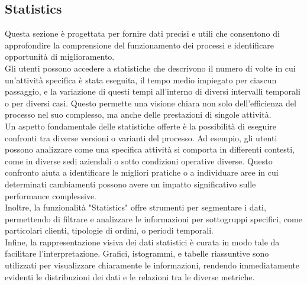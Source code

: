 \documentclass{article}
\begin{document}
\subsection{Statistics}
Questa sezione è progettata per fornire dati precisi e utili che consentono di approfondire la comprensione del funzionamento dei processi e identificare opportunità di miglioramento.\\
Gli utenti possono accedere a statistiche che descrivono il numero di volte in cui un'attività specifica è stata eseguita, il tempo medio impiegato per ciascun passaggio, e la variazione di questi tempi all'interno di diversi intervalli temporali o per diversi casi. Questo permette una visione chiara non solo dell'efficienza del processo nel suo complesso, ma anche delle prestazioni di singole attività.\\
Un aspetto fondamentale delle statistiche offerte è la possibilità di eseguire confronti tra diverse versioni o varianti del processo. Ad esempio, gli utenti possono analizzare come una specifica attività si comporta in differenti contesti, come in diverse sedi aziendali o sotto condizioni operative diverse. Questo confronto aiuta a identificare le migliori pratiche o a individuare aree in cui determinati cambiamenti possono avere un impatto significativo sulle performance complessive.\\
Inoltre, la funzionalità "Statistics" offre strumenti per segmentare i dati, permettendo di filtrare e analizzare le informazioni per sottogruppi specifici, come particolari clienti, tipologie di ordini, o periodi temporali.\\
Infine, la rappresentazione visiva dei dati statistici è curata in modo tale da facilitare l'interpretazione. Grafici, istogrammi, e tabelle riassuntive sono utilizzati per visualizzare chiaramente le informazioni, rendendo immediatamente evidenti le distribuzioni dei dati e le relazioni tra le diverse metriche.
\end{document}

